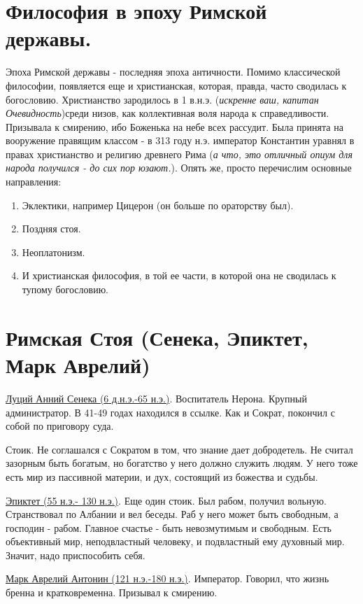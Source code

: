 \section{Философия в эпоху Римской державы.}
Эпоха Римской державы - последняя эпоха античности. Помимо классической философии, появляется еще и христианская, которая, правда, часто сводилась к богословию. Христианство зародилось в 1 в.н.э. (\textit{искренне ваш, капитан Очевидность})среди низов, как коллективная воля народа к справедливости. Призывала к смирению, ибо Боженька на небе всех рассудит. Была принята на вооружение правящим классом - в 313 году н.э. император Константин уравнял в правах христианство и религию древнего Рима (\textit{а что, это отличный опиум для народа получился - до сих пор юзают.}). Опять же, просто перечислим основные направления:
\begin{enumerate}
\item Эклектики, например Цицерон (он больше по ораторству был).
\item Поздняя стоя. 
\item Неоплатонизм.
\item И христианская философия, в той ее части, в которой она не сводилась к тупому богословию.
\end{enumerate}


\section{Римская Стоя (Сенека, Эпиктет, Марк Аврелий)}
\hspace{8pt} 
\underline{Луций Анний Сенека  (6 д.н.э.-65 н.э.)}. Воспитатель Нерона. Крупный администратор. В 41-49 годах находился в ссылке. Как и Сократ, покончил с собой по приговору суда.

Стоик. Не соглашался с Сократом в том, что знание дает добродетель. Не считал зазорным быть богатым, но богатство у него должно служить людям. У него тоже есть мир из пассивной материи, и дух, состоящий из божества и судьбы. 

\underline{Эпиктет (55 н.э.- 130 н.э.)}. Еще один стоик. Был рабом, получил вольную. Странствовал по Албании и вел беседы. Раб у него может быть свободным, а господин - рабом. Главное счастье - быть невозмутимым и свободным. Есть объективный мир, неподвластный человеку, и подвластный ему духовный мир. Значит, надо приспособить себя.

\underline{Марк Аврелий Антонин (121 н.э.-180 н.э.)}. Император. Говорил, что жизнь бренна и кратковременна. Призывал к смирению.


